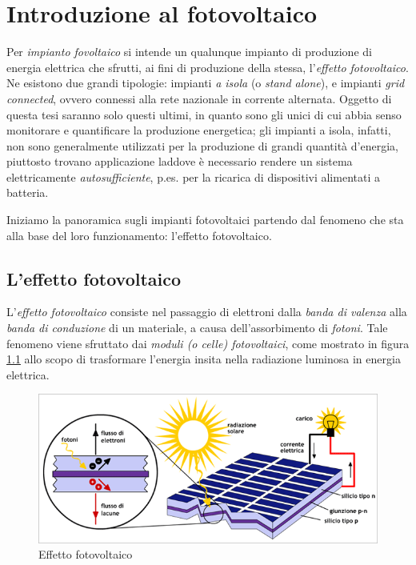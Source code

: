 \clearpage{\pagestyle{empty}\cleardoublepage}
\chapter{Introduzione al fotovoltaico}
%
Per \emph{impianto fovoltaico} si intende un qualunque 
impianto di produzione di energia elettrica che sfrutti, ai fini 
di produzione della stessa, l'\emph{effetto fotovoltaico}.
%
Ne esistono due grandi tipologie: impianti \emph{a isola} (o \emph{stand alone}), 
e impianti \emph{grid connected}, ovvero connessi alla rete nazionale in 
corrente alternata.
%
Oggetto di questa tesi saranno solo questi ultimi, in quanto sono gli unici
di cui abbia senso monitorare e quantificare la produzione energetica; gli impianti 
a isola, infatti, non sono generalmente utilizzati per la produzione di grandi
quantit\`a d'energia, piuttosto trovano applicazione laddove \`e necessario
rendere un sistema elettricamente \emph{autosufficiente}, p.es. per la 
ricarica di dispositivi alimentati a batteria.
%

%
Iniziamo la panoramica sugli impianti fotovoltaici partendo dal fenomeno
che sta alla base del loro funzionamento: l'effetto fotovoltaico.
%

%
\section{L'effetto fotovoltaico}
L'\emph{effetto fotovoltaico} consiste nel passaggio di elettroni 
dalla \emph{banda di valenza} alla \emph{banda di conduzione} di 
un materiale, a causa dell'assorbimento di \emph{fotoni}. 
%
Tale fenomeno viene sfruttato dai \emph{moduli (o celle) fotovoltaici}, 
come mostrato in figura \ref{effetto-fv} allo scopo di trasformare 
l'energia insita nella radiazione luminosa in energia elettrica.
%
\begin{figure}[!h]
\centering
\includegraphics[width=350pt]{img/effetto-fovoltaico.png}
\caption{Effetto fotovoltaico}
\label{effetto-fv}
\end{figure}
%


